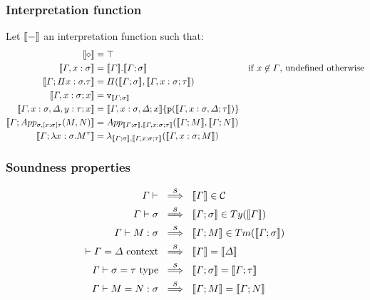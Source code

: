 \documentclass[aspectratio=169]{beamer}
\newcommand{\cntxt}{\ \mathrm{context}}
\newcommand{\typ}{\ \mathrm{type}}
\newcommand\defeq{\stackrel{\mathclap{\normalfont\mbox{def}}}{\ =\ }}
\newcommand{\soundness}{\stackrel{\mathclap{\normalfont\mbox{$s$}}}{\ \implies\ }}
\newcommand{\Gamdash}{\Gamma\vdash}
\newcommand{\cate}{\mathcal{C}}
\newcommand{\pp}{\texttt{p}}
\newcommand{\extension}{\Gamma.\sigma}
\newcommand{\Mbar}{\overline{M}}
\DeclarePairedDelimiter\Brackets{\llbracket}{\rrbracket}
\begin{document}
    \begin{frame}
        \frametitle{Interpretation function}
        Let $\Brackets{-}$ an interpretation function such that:
        \begin{align*}
            \Brackets{\diamond} &= \top\\
            \Brackets{\Gamma,x:\sigma} &= \Brackets{\Gamma}.\Brackets{\Gamma;\sigma} &\text{if $x \not\in\Gamma$, undefined otherwise}\\
            \Brackets{\Gamma;\Pi x:\sigma.\tau} &= \Pi(\Brackets{\Gamma;\sigma},\Brackets{\Gamma,x:\sigma;\tau})\\
            \Brackets{\Gamma,x:\sigma;x} &= \texttt{v}_{\Brackets{\Gamma;\sigma}}\\
            \Brackets{\Gamma,x:\sigma,\Delta,y:\tau;x} &= \Brackets{\Gamma,x:\sigma,\Delta;x}\{\pp(\Brackets{\Gamma,x:\sigma,\Delta;\tau})\}\\
            \Brackets{\Gamma;App_{\sigma,[x:\sigma]\tau}(M,N)} &= App_{\Brackets{\Gamma;\sigma},\Brackets{\Gamma,x:\sigma;\tau}}(\Brackets{\Gamma;M},\Brackets{\Gamma;N})\\
            \Brackets{\Gamma;\lambda x:\sigma.M^\tau} &= \lambda_{\Brackets{\Gamma;\sigma},\Brackets{\Gamma,x:\sigma;\tau}}(\Brackets{\Gamma,x:\sigma;M})
        \end{align*}
    \end{frame}

    \begin{frame}
        \frametitle{Soundness properties}
        \begin{align*}
            \Gamdash &\soundness \Brackets{\Gamma}\in\cate\\
            \Gamdash \sigma &\soundness \Brackets{\Gamma;\sigma}\in Ty(\Brackets{\Gamma})\\
            \Gamdash M:\sigma &\soundness \Brackets{\Gamma;M}\in Tm(\Brackets{\Gamma;\sigma})\\
            \vdash\Gamma = \Delta \cntxt &\soundness\Brackets{\Gamma}=\Brackets{\Delta}\\
            \Gamdash\sigma=\tau\typ&\soundness\Brackets{\Gamma;\sigma}=\Brackets{\Gamma;\tau}\\
            \Gamdash M = N:\sigma&\soundness\Brackets{\Gamma;M}=\Brackets{\Gamma;N}
        \end{align*}
    \end{frame}

\end{document}
